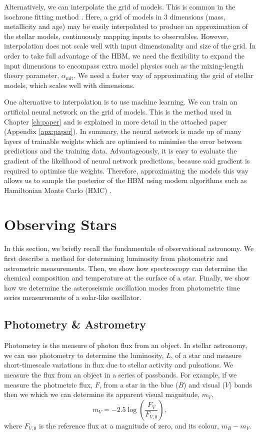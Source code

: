 Alternatively, we can interpolate the grid of models. This is common in the isochrone fitting method \citep{}. Here, a grid of models in 3 dimensions (mass, metallicity and age) may be easily interpolated to produce an approximation of the stellar models, continuously mapping inputs to observables. However, interpolation does not scale well with input dimensionality and size of the grid. In order to take full advantage of the HBM, we need the flexibility to expand the input dimensions to encompass extra model physics such as the mixing-length theory parameter, $\alpha_\mathrm{mlt}$. We need a faster way of approximating the grid of stellar models, which scales well with dimensions.

One alternative to interpolation is to use machine learning. We can train an artificial neural network on the grid of models. This is the method used in Chapter \ref{ch:paper} and is explained in more detail in the attached paper (Appendix \ref{apx:paper}). In summary, the neural network is made up of many layers of trainable weights which are optimised to minimise the error between predictions and the training data. Advantageously, it is easy to evaluate the gradient of the likelihood of neural network predictions, because said gradient is required to optimise the weights. Therefore, approximating the models this way allows us to sample the posterior of the HBM using modern algorithms such as Hamiltonian Monte Carlo (HMC) \citep[see e.g. the No-U-Turn Sampler][]{Homan.Gelman2014}.

\section{Observing Stars}\label{sec:obs}

In this section, we briefly recall the fundamentals of observational astronomy. We first describe a method for determining luminosity from photometric and astrometric measurements. Then, we show how spectroscopy can determine the chemical composition and temperature at the surface of a star. Finally, we show how we determine the asteroseismic oscillation modes from photometric time series measurements of a solar-like oscillator.

\subsection{Photometry \& Astrometry}

Photometry is the measure of photon flux from an object. In stellar astronomy, we can use photometry to determine the luminosity, $L$, of a star and measure short-timescale variations in flux due to stellar activity and pulsations. We measure the flux from an object in a series of passbands. For example, if we measure the photmetric flux, $F$, from a star in the blue ($B$) and visual ($V$) bands then we which we can determine its apparent visual magnitude, $m_V$,
\begin{equation}
    m_V = - 2.5 \log(\frac{F_V}{F_{V,0}}),
\end{equation}
where $F_{V,0}$ is the reference flux at a magnitude of zero, and its colour, $m_B - m_V$.

